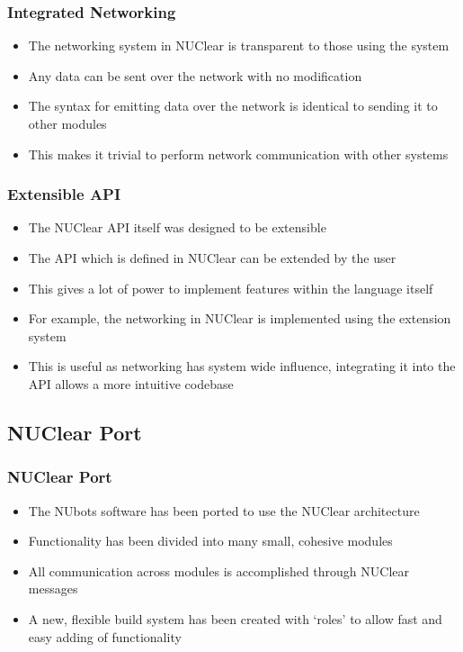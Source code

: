 \documentclass{beamer}
\begin{document}
\begin{frame}
	\frametitle{Integrated Networking}
	\begin{itemize}
		\item The networking system in NUClear is transparent to those using the system
		\item Any data can be sent over the network with no modification
		\item The syntax for emitting data over the network is identical to sending it to other modules
		\item This makes it trivial to perform network communication with other systems
	\end{itemize}
\end{frame}

\begin{frame}
	\frametitle{Extensible API}
	\begin{itemize}
		\item The NUClear API itself was designed to be extensible
		\item The API which is defined in NUClear can be extended by the user
		\item This gives a lot of power to implement features within the language itself
		\item For example, the networking in NUClear is implemented using the extension system
		\item This is useful as networking has system wide influence, integrating it into the API allows a more intuitive codebase
	\end{itemize}
\end{frame}

\subsection{NUClear Port}
\begin{frame}
	\frametitle{NUClear Port}

	\begin{itemize}
		\item The NUbots software has been ported to use the NUClear architecture
		\item Functionality has been divided into many small, cohesive modules
		\item All communication across modules is accomplished through NUClear messages
		\item A new, flexible build system has been created with `roles' to allow fast and easy adding of functionality
	\end{itemize}
\end{frame}
\end{document}
